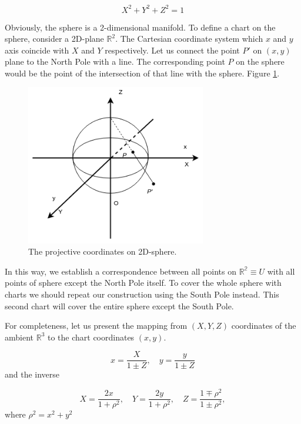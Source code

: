 \documentclass[a4paper,10pt]{article}
\begin{document}
\begin{equation}
 X^2 + Y^2 + Z^2 = 1
\end{equation}

Obviously, the sphere is a 2-dimensional manifold. To define a chart on the sphere, consider a 2D-plane $\mathbb{R}^2$. The Cartesian coordinate system which $x$ and $y$ axis coincide with $X$ and $Y$ respectively.   Let us connect the point $P'$ on $(x,y)$ plane to the North Pole with a line. The corresponding point $P$ on the sphere would be the point of the intersection of that line with the sphere.  Figure \ref{fig:riemann}.

\begin{figure}[h]
\centering
 \includegraphics[width=0.7\textwidth]{../../images/Sphere.png}
 \caption{The projective coordinates on 2D-sphere.  }
 \label{fig:riemann}
\end{figure}

In this way, we establish a correspondence between all points on $\mathbb{R^2} \equiv U$ with all points of sphere except the North Pole itself. To cover the whole sphere with  charts we should repeat our construction using the South Pole instead. This second chart will cover the entire sphere except the South Pole. 

For completeness, let us present the mapping from $(X,Y,Z)$ coordinates of the ambient $\mathbb{R}^3$ to the chart coordinates $(x,y)$.

\begin{equation}
 x = \frac{X}{1\pm Z},\quad y = \frac{y}{1\pm Z}
\end{equation}
and the inverse 

\begin{equation}
 X = \frac{2x}{1+\rho^2},\quad Y = \frac{2y}{1+\rho^2}, \quad Z = \frac{1\mp\rho^2}{1\pm\rho^2}, 
\end{equation}
where $\rho^2 = x^2 + y^2$
\end{document}

